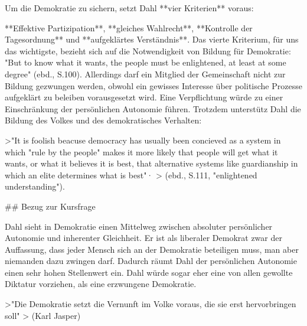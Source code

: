 Um die Demokratie zu sichern, setzt Dahl **vier Kriterien** voraus:

**Effektive Partizipation**, **gleiches Wahlrecht**, **Kontrolle der Tagesordnung** und **aufgeklärtes Verständnis**.
Das vierte Kriterium, für uns das wichtigste, bezieht sich auf die Notwendigkeit von Bildung für Demokratie:
"But to know what it wants, the people must be enlightened, at least at some degree" (ebd., S.100).
Allerdings darf ein Mitglied der Gemeinschaft nicht zur Bildung gezwungen werden, obwohl ein gewisses Interesse über politische Prozesse aufgeklärt zu beleiben vorausgesetzt wird.
Eine Verpflichtung würde zu einer Einschränkung der persönlichen Autonomie führen.
Trotzdem unterstütz Dahl die Bildung des Volkes und des demokratisches Verhalten:

>"It is foolish beacuse democracy has usually been concieved as a system in which "rule by the people" makes it more likely that people will get what it wants, or what it believes it is best, that alternative systems like guardianship in which an elite determines what is best"·
> (ebd., S.111, "enlightened understanding").


## Bezug zur Kursfrage

Dahl sieht in Demokratie einen Mittelweg zwischen absoluter persönlicher Autonomie und inherenter Gleichheit.
Er ist als liberaler Demokrat zwar der Auffassung, dass jeder Mensch sich an der Demokratie beteiligen muss, man aber niemanden dazu zwingen darf.
Dadurch räumt Dahl der persönlichen Autonomie einen sehr hohen Stellenwert ein.
Dahl würde sogar eher eine von allen gewollte Diktatur vorziehen, als eine erzwungene Demokratie.

>"Die Demokratie setzt die Vernunft im Volke voraus, die sie erst hervorbringen soll"
> (Karl Jasper)

